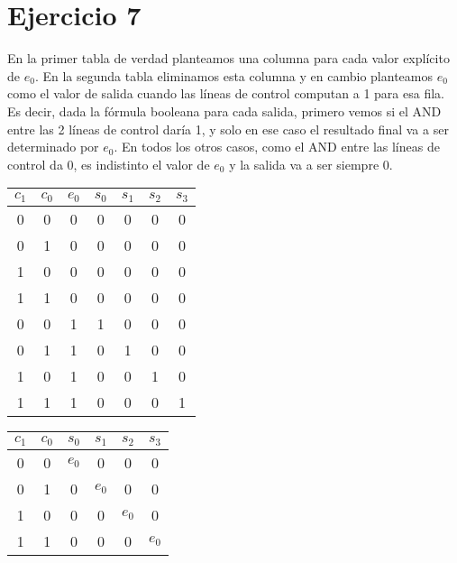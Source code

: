 \begin{figure}[H]
    
\end{figure}

\section{Ejercicio 7}

En la primer tabla de verdad planteamos una columna para cada valor explícito de $e_0$. En la segunda tabla eliminamos esta columna y en cambio planteamos $e_0$ como el valor de salida cuando las líneas de control computan a 1 para esa fila. Es decir, dada la fórmula booleana para cada salida, primero vemos si el AND entre las 2 líneas de control daría 1, y solo en ese caso el resultado final va a ser determinado por $e_0$. En todos los otros casos, como el AND entre las líneas de control da 0, es indistinto el valor de $e_0$ y la salida va a ser siempre $0$.

\begin{multicols}{2}
    \begin{tabular}{|c|c|c||c|c|c|c|}
        $c_1$ & $c_0$ & $e_0$ & $s_0$ & $s_1$ & $s_2$ & $s_3$ \\
        \hline
        0 & 0 & 0 & 0 & 0 & 0 & 0 \\
        0 & 1 & 0 & 0 & 0 & 0 & 0 \\
        1 & 0 & 0 & 0 & 0 & 0 & 0 \\
        1 & 1 & 0 & 0 & 0 & 0 & 0 \\
        0 & 0 & 1 & 1 & 0 & 0 & 0 \\
        0 & 1 & 1 & 0 & 1 & 0 & 0 \\
        1 & 0 & 1 & 0 & 0 & 1 & 0 \\
        1 & 1 & 1 & 0 & 0 & 0 & 1 \\
    \end{tabular}

    \begin{tabular}{|c|c||c|c|c|c|}
        $c_1$ & $c_0$ & $s_0$ & $s_1$ & $s_2$ & $s_3$ \\
        \hline
        0 & 0 & $e_0$ & 0 & 0 & 0 \\
        0 & 1 & 0 & $e_0$ & 0 & 0 \\
        1 & 0 & 0 & 0 & $e_0$ & 0 \\
        1 & 1 & 0 & 0 & 0 & $e_0$ \\
    \end{tabular}
\end{multicols}

